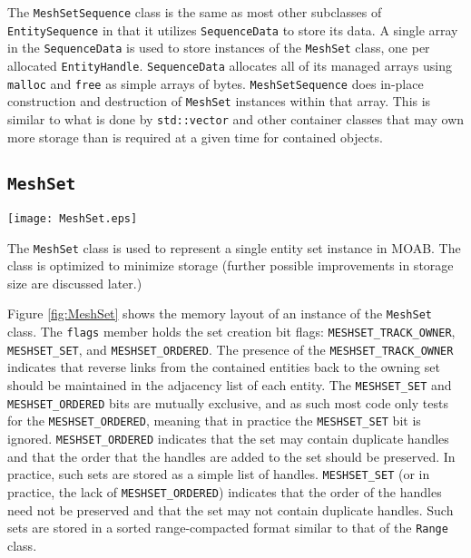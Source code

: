 \documentclass{report}
\begin{document}
The \texttt{MeshSetSequence} class is the same as most other subclasses of \texttt{EntitySequence} in that it utilizes \texttt{SequenceData} to store
its data.  A single array in the \texttt{SequenceData} is used to store 
instances of the \texttt{MeshSet} class, one per allocated \texttt{EntityHandle}.  \texttt{SequenceData} allocates all of its managed
arrays using \texttt{malloc} and \texttt{free} as simple arrays of bytes.  \texttt{MeshSetSequence} does in-place construction and destruction of \texttt{MeshSet} instances within that array.  This is similar to what is done
by \texttt{std::vector} and other container classes that may own more
storage than is required at a given time for contained objects.

\subsection{\texttt{MeshSet}}

\begin{figure*}[htbp]
\begin{center}
\texttt{[image: MeshSet.eps]}
\caption{SequenceManager and Related Classes \label{fig:MeshSet}}
\end{center}
\end{figure*}

The \texttt{MeshSet} class is used to represent a single entity set instance in MOAB.  The class is optimized to minimize storage (further possible improvements in storage size are discussed later.)  

Figure \ref{fig:MeshSet} shows the memory layout of an instance of the \texttt{MeshSet} class.  The \texttt{flags} member holds the set creation bit flags: \texttt{MESHSET\_TRACK\_OWNER}, \texttt{MESHSET\_SET}, and \texttt{MESHSET\_ORDERED}.  The presence of the \texttt{MESHSET\_TRACK\_OWNER}
indicates that reverse links from the contained entities back to the owning set should be maintained in the adjacency list of each entity.  The \texttt{MESHSET\_SET} and \texttt{MESHSET\_ORDERED} bits are mutually exclusive, and as such most code only tests for the \texttt{MESHSET\_ORDERED}, meaning that in practice the \texttt{MESHSET\_SET} bit is ignored.  \texttt{MESHSET\_ORDERED} indicates that the set may contain duplicate handles and that the order that the handles are added to the set should be preserved.  In practice, such sets are stored as a simple list of handles.  \texttt{MESHSET\_SET} (or in practice, the lack of \texttt{MESHSET\_ORDERED}) indicates that the order of the handles need not be preserved and that the set may not contain duplicate handles.  Such sets are stored in a sorted range-compacted format similar to that of the \texttt{Range} class.
\end{document}
